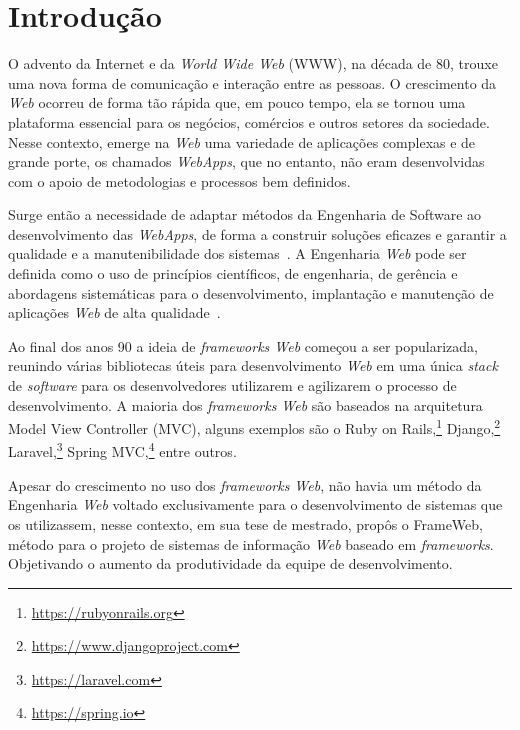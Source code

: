 \chapter{Introdução}
\label{sec-intro}

O advento da Internet e da \textit{World Wide Web} (WWW), na década de 80, trouxe uma nova
forma de comunicação e interação entre as pessoas. O crescimento da \textit{Web} ocorreu de forma tão
rápida que, em pouco tempo, ela se tornou uma plataforma essencial para os negócios, comércios
e outros setores da sociedade. Nesse contexto, emerge na \textit{Web} uma variedade de aplicações
complexas e de grande porte, os chamados \textit{WebApps}, que no entanto, não eram desenvolvidas com o apoio de
metodologias e processos bem definidos.


Surge então a necessidade de adaptar métodos da Engenharia de Software ao desenvolvimento
das \textit{WebApps}, de forma a construir soluções eficazes e garantir a qualidade e a manutenibilidade 
dos sistemas~\cite{beder:2017}. A Engenharia \textit{Web} pode ser definida como o uso de 
princípios científicos, de engenharia, de gerência e abordagens sistemáticas para o desenvolvimento,
implantação e manutenção de aplicações \textit{Web} de alta qualidade~\cite{murugesan:2001}.

Ao final dos anos 90 a ideia de \textit{frameworks Web} começou a ser popularizada, reunindo 
várias bibliotecas úteis para desenvolvimento \textit{Web} em uma única \textit{stack} de \textit{software}
para os desenvolvedores utilizarem e agilizarem o processo de desenvolvimento. A maioria dos
\textit{frameworks Web} são baseados na arquitetura Model View Controller (MVC), alguns exemplos
são o Ruby on Rails,\footnote{\url{https://rubyonrails.org}} Django,\footnote{\url{https://www.djangoproject.com}} 
Laravel,\footnote{\url{https://laravel.com}} Spring MVC,\footnote{\url{https://spring.io}} entre outros.

Apesar do crescimento no uso dos \textit{frameworks Web}, não havia um método da Engenharia \textit{Web} 
voltado exclusivamente para o desenvolvimento de sistemas que os utilizassem, nesse contexto, em sua 
tese de mestrado,  propôs o FrameWeb, método para o projeto de sistemas de 
informação \textit{Web} baseado em \textit{frameworks}. Objetivando o aumento da produtividade da 
equipe de desenvolvimento.

